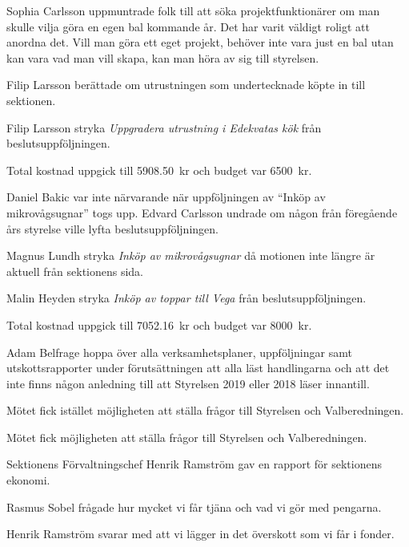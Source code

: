\documentclass[10pt]{article}
\begin{document}
\begin{paragrafer}
Sophia Carlsson uppmuntrade folk till att söka projektfunktionärer om man skulle vilja göra en egen bal kommande år.
Det har varit väldigt roligt att anordna det. Vill man göra ett eget projekt, behöver inte vara just en bal utan kan vara vad man vill skapa, kan man höra av sig till styrelsen.


Filip Larsson berättade om utrustningen som undertecknade köpte in till sektionen.

Filip Larsson \ypa stryka \emph{Uppgradera utrustning i Edekvatas kök} från beslutsuppföljningen. 

    Total kostnad uppgick till \SI{5908,50}{kr} och budget var \SI{6500}{kr}.

\Mbaby

Daniel Bakic var inte närvarande när uppföljningen av ``Inköp av mikrovågsugnar'' togs upp. Edvard Carlsson undrade om någon från föregående års styrelse ville lyfta 
beslutsuppföljningen. 

Magnus Lundh \ypa stryka \emph{Inköp av mikrovågsugnar} då motionen inte längre är aktuell från sektionens sida.

\Mbaby

Malin Heyden \ypa stryka \emph{Inköp av toppar till Vega} från beslutsuppföljningen. 

    Total kostnad uppgick till \SI{7052,16}{kr} och budget var \SI{8000}{kr}. 

\Mbaby

Adam Belfrage \ypa hoppa över alla verksamhetsplaner, 
    uppföljningar samt utskottsrapporter under förutsättningen att alla läst handlingarna och att det inte finns någon 
        anledning till att Styrelsen 2019 eller 2018 läser innantill.

\Mbaby

Mötet fick istället möjligheten att ställa frågor till Styrelsen och Valberedningen.

Mötet fick möjligheten att ställa frågor till Styrelsen och Valberedningen.


Sektionens Förvaltningschef Henrik Ramström gav en rapport för sektionens ekonomi.

Rasmus Sobel frågade hur mycket vi får tjäna och vad vi gör med pengarna.

Henrik Ramström svarar med att vi lägger in det överskott som vi får i fonder. 



\end{paragrafer}
\end{document}
